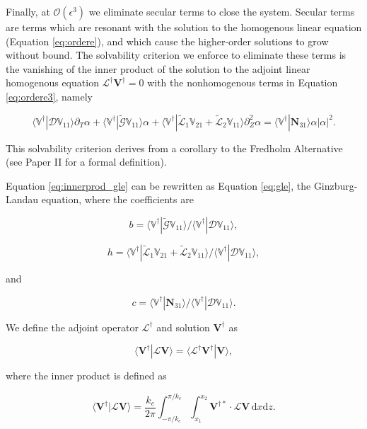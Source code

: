 \documentclass[twocolumn]{aastex61}
\newcommand{\beq}{\begin{equation}}
\newcommand{\eeq}{\end{equation}}
\begin{document}
Finally, at $\mathcal{O}(\epsilon^3)$ we eliminate secular terms to close the system. Secular terms are terms which are resonant with the solution to the homogenous linear equation (Equation \ref{eq:ordere}), and which cause the higher-order solutions to grow without bound. The solvability criterion we enforce to eliminate these terms is the vanishing of the inner product of the solution to the adjoint linear homogenous equation $\mathcal{L}^\dagger \mathbf{V}^\dagger = 0$ with the nonhomogenous terms in Equation \ref{eq:ordere3}, namely

\beq\label{eq:innerprod_gle}
\langle \mathbb{V}^\dagger | \mathcal{D} \mathbb{V}_{11} \rangle \partial_T \alpha + \langle  \mathbb{V}^\dagger | \widetilde{\mathcal{G}} \mathbb{V}_{11} \rangle \alpha +  \langle \mathbb{V}^\dagger | \widetilde{\mathcal{L}}_1 \mathbb{V}_{21} + \widetilde{\mathcal{L}}_2 \mathbb{V}_{11} \rangle \partial_Z^2 \alpha = \langle \mathbb{V}^\dagger | \mathbf{N}_{31} \rangle \alpha |\alpha|^2.
\eeq

This solvability criterion derives from a corollary to the Fredholm Alternative (see Paper II for a formal definition). 

Equation \ref{eq:innerprod_gle} can be rewritten as Equation \ref{eq:gle}, the Ginzburg-Landau equation, where the coefficients are 

\beq
b = \langle  \mathbb{V}^\dagger | \widetilde{\mathcal{G}} \mathbb{V}_{11} \rangle / \langle \mathbb{V}^\dagger | \mathcal{D} \mathbb{V}_{11} \rangle,
\eeq

\beq
h = \langle \mathbb{V}^\dagger | \widetilde{\mathcal{L}}_1 \mathbb{V}_{21} + \widetilde{\mathcal{L}}_2 \mathbb{V}_{11} \rangle / \langle \mathbb{V}^\dagger | \mathcal{D} \mathbb{V}_{11} \rangle,
\eeq

and

\beq
c = \langle \mathbb{V}^\dagger | \mathbf{N}_{31} \rangle / \langle \mathbb{V}^\dagger | \mathcal{D} \mathbb{V}_{11} \rangle. 
\eeq

We define the adjoint operator $\mathcal{L}^\dagger$ and solution $\mathbf{V}^\dagger$ as 

\beq
\langle \mathbf{V^\dagger} | \mathcal{L} \mathbf{V} \rangle = \langle \mathcal{L}^\dagger \mathbf{V}^\dagger | \mathbf{V} \rangle,
\eeq

where the inner product is defined as 

\beq\label{eq:inner_product_def}
\langle \mathbf{V^\dagger} | \mathcal{L} \mathbf{V} \rangle = \frac{k_c}{2\pi} \int_{-\pi/k_c}^{\pi/k_c} \int_{x_1}^{x_2} \mathbf{V}^{\dagger*} \cdot \mathcal{L} \mathbf{V} \, \mathrm{d} x \mathrm{d} z.
\eeq
\end{document}
